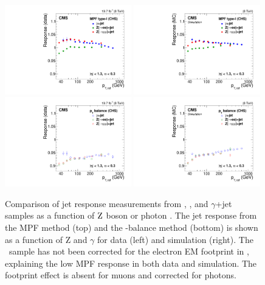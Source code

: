 \documentclass[11pt,twoside,a4paper,cmspaper,final,collab]{cms-tdr}
\begin{document}
\begin{figure}[htbp!]
\begin{center}
\includegraphics[width=0.49\textwidth]{Figure_021-a.pdf}
\includegraphics[width=0.49\textwidth]{Figure_021-b.pdf}
\includegraphics[width=0.49\textwidth]{Figure_021-c.pdf}
\includegraphics[width=0.49\textwidth]{Figure_021-d.pdf}
\end{center}
\caption{\label{fig:absscale}
Comparison of jet response measurements from \zmmjet, \zeejet, and $\gamma$+jet samples as a function of $\mathrm{Z}$ boson or photon \pt.
The jet response from the MPF method (top) and the \pt-balance method (bottom) is shown as a function of Z and $\gamma$ \pt for data
(left) and simulation (right).
The \zeejet\ sample has not been corrected for the electron EM footprint in \ptvecmiss, explaining the low MPF response in both data and simulation. The footprint effect is absent for muons and corrected for photons.
}
\end{figure}
\end{document}
